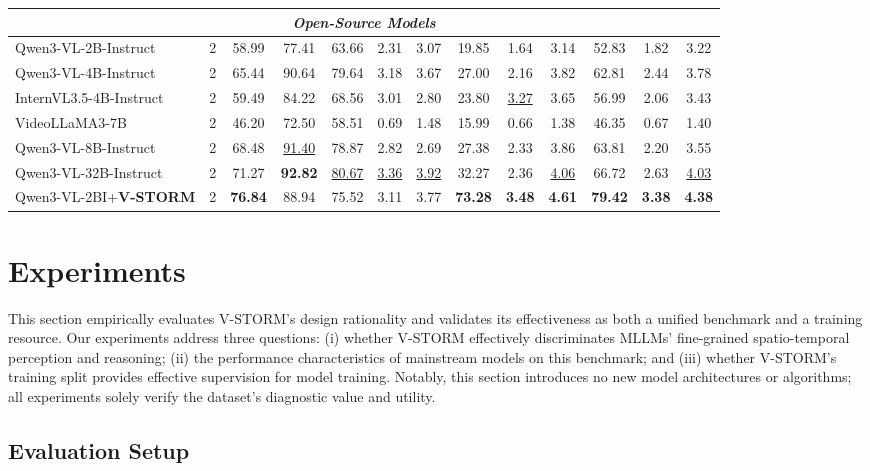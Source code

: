 \documentclass[letterpaper]{article} %
\begin{document}
\begin{table}[!t]
\begin{tabular}{l c c c c c c c c c c c c}
\multicolumn{13}{c}{\textit{\textbf{Open-Source Models}}} \\
\midrule
Qwen3-VL-2B-Instruct  & 2  & 58.99 & 77.41 & 63.66 & 2.31 & 3.07 & 19.85 & 1.64 & 3.14 & 52.83 & 1.82 & 3.22 \\
Qwen3-VL-4B-Instruct  & 2 & 65.44 & 90.64 & 79.64 & 3.18 & 3.67 & 27.00 & 2.16 & 3.82 & 62.81 & 2.44 & 3.78 \\
InternVL3.5-4B-Instruct   & 2 & 59.49 & 84.22 & 68.56 & 3.01 & 2.80 & 23.80 & \underline{3.27} & 3.65 & 56.99 & 2.06 & 3.43 \\
VideoLLaMA3-7B & 2 & 46.20 & 72.50 & 58.51 & 0.69 & 1.48 & 15.99 & 0.66 & 1.38 & 46.35 & 0.67 & 1.40 \\
Qwen3-VL-8B-Instruct & 2 & 68.48 & \underline{91.40} & 78.87 & 2.82 & 2.69 & 27.38 & 2.33 & 3.86 & 63.81 & 2.20 & 3.55 \\
Qwen3-VL-32B-Instruct  & 2 & 71.27 & \textbf{92.82} & \underline{80.67} & \underline{3.36} & \underline{3.92} & 32.27 & 2.36 & \underline{4.06} & 66.72 & 2.63 & \underline{4.03} \\

\midrule
\rowcolor{ourshade}
Qwen3-VL-2BI+\textbf{{V-STORM}} 
& 2  
& \textbf{76.84} & 88.94 & 75.52 & 3.11 & 3.77 & \textbf{73.28} & \textbf{3.48} & \textbf{4.61} & \textbf{79.42} & \textbf{3.38} & \textbf{4.38} \\


\bottomrule
\end{tabular}
\end{table}

\section{Experiments}
This section empirically evaluates V-STORM's design rationality and validates its effectiveness as both a unified benchmark and a training resource. Our experiments address three questions: (i) whether V-STORM effectively discriminates MLLMs' fine-grained spatio-temporal perception and reasoning; (ii) the performance characteristics of mainstream models on this benchmark; and (iii) whether V-STORM's training split provides effective supervision for model training. Notably, this section introduces no new model architectures or algorithms; all experiments solely verify the dataset's diagnostic value and utility.

\subsection{Evaluation Setup}
\end{document}
